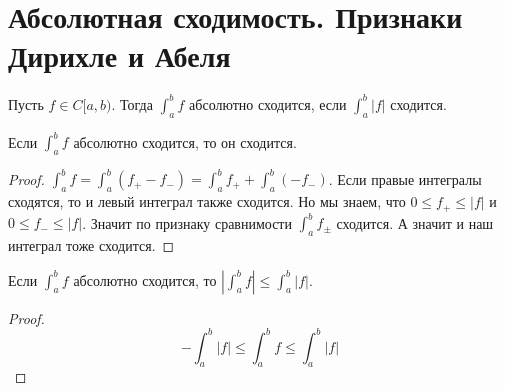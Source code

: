 \section{Абсолютная сходимость. Признаки Дирихле и Абеля}
\begin{conj}
    Пусть $f \in C[a, b)$. Тогда $\int_{a}^{b} f$ абсолютно сходится, если $\int_{a}^{b} |f|$ сходится.
  \end{conj}
  
  \begin{theorem}
    Если $\int_{a}^{b} f$ абсолютно сходится, то он сходится.
  \end{theorem}
  \begin{proof}
    $\int_{a}^{b} f = \int_{a}^{b}(f_+ - f_-) = \int_{a}^{b} f_+ + \int_{a}^{b} (-f_-)$. Если правые интегралы сходятся, то и левый интеграл также сходится. Но мы знаем, что $0 \leq f_+ \leq |f|$ и $0 \leq f_- \leq |f|$. Значит по признаку сравнимости $\int_{a}^{b} f_{\pm}$ сходится. А значит и наш интеграл тоже сходится.
  \end{proof}
  
  \begin{notice}
    Если $\int_{a}^{b} f$ абсолютно сходится, то $\left | \int_{a}^{b} f \right | \leq \int_{a}^{b} |f|$.
  \end{notice}
  \begin{proof}
    \begin{equation*}
      -\int_{a}^{b} |f| \leq \int_{a}^{b} f \leq \int_{a}^{b} |f|
    \end{equation*}
  \end{proof}
  
